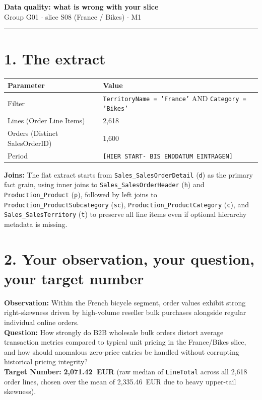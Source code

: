 \documentclass[10pt,a4paper]{article}
\begin{document}
\begingroup\centering
{{\Large\bfseries Data quality: what is wrong with your slice}}\\[0.3ex]
{{\small Group G01 $\cdot$ slice S08 (France / Bikes) $\cdot$ M1}}\\
\endgroup
\vspace{1ex}\hrule\vspace{1.2ex}

\section*{1. The extract}
\begin{table}[h!]
\centering
\begin{tabular}{ll}
\toprule
\textbf{Parameter} & \textbf{Value} \\
\midrule
Filter & \texttt{TerritoryName = 'France'} AND \texttt{Category = 'Bikes'} \\
Lines (Order Line Items) & 2,618 \\
Orders (Distinct SalesOrderID) & 1,600 \\
Period & \texttt{[HIER START- BIS ENDDATUM EINTRAGEN]} \\
\bottomrule
\end{tabular}
\end{table}

\textbf{Joins:} The flat extract starts from \texttt{Sales\_SalesOrderDetail} (\texttt{d}) as the primary fact grain, using inner joins to \texttt{Sales\_SalesOrderHeader} (\texttt{h}) and \texttt{Production\_Product} (\texttt{p}), followed by left joins to \texttt{Production\_ProductSubcategory} (\texttt{sc}), \texttt{Production\_ProductCategory} (\texttt{c}), and \texttt{Sales\_SalesTerritory} (\texttt{t}) to preserve all line items even if optional hierarchy metadata is missing.

\section*{2. Your observation, your question, your target number}
\textbf{Observation:} Within the French bicycle segment, order values exhibit strong right-skewness driven by high-volume reseller bulk purchases alongside regular individual online orders. \\
\textbf{Question:} How strongly do B2B wholesale bulk orders distort average transaction metrics compared to typical unit pricing in the France/Bikes slice, and how should anomalous zero-price entries be handled without corrupting historical pricing integrity? \\
\textbf{Target Number:} \textbf{2,071.42~EUR} (raw median of \texttt{LineTotal} across all 2,618 order lines, chosen over the mean of 2,335.46~EUR due to heavy upper-tail skewness).
\end{document}

